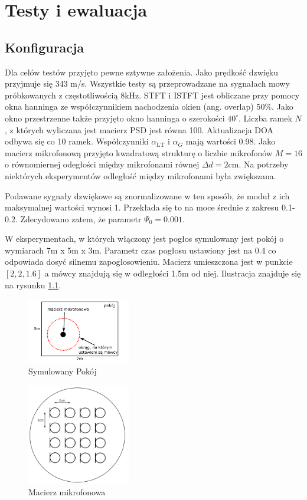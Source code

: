 \chapter{Testy i ewaluacja}
\label{chapter-5}
\section{Konfiguracja}
Dla celów testów przyjęto pewne sztywne założenia. Jako prędkość dzwięku przyjmuje się 343 m/s. Wszystkie testy są przeprowadzane na sygnałach mowy próbkowanych z częstotliwością 8kHz. STFT i ISTFT jest obliczane przy pomocy okna hanninga \cite{hann} ze współczynnikiem nachodzenia okien (ang. overlap) 50$\%$. Jako okno przestrzenne także przyjęto okno hanninga o szerokości $40^{\circ}$. Liczba ramek $N$, z których wyliczana jest macierz PSD jest równa 100. Aktualizacja DOA odbywa się co 10 ramek. Współczynniki $\alpha_{\mathrm{LT}}$ i $\alpha_{G}$ mają wartości 0.98. Jako macierz mikrofonową przyjęto kwadratową strukturę o liczbie mikrofonów $M=16$ o równomiernej odegłości między mikrofonami równej $\Delta d = 2$cm. Na potrzeby niektórych eksperymentów odległość między mikrofonami była zwiększana.

\noindent Podawane sygnały dzwiękowe są znormalizowane w ten sposób, że moduł z ich maksymalnej wartości wynosi 1. Przekłada się to na moce średnie z zakresu 0.1-0.2. Zdecydowano zatem, że parametr $\Psi_{0} = 0.001$. 

\noindent W eksperymentach, w których włączony jest pogłos symulowany jest pokój o wymiarach 7m x 5m x 3m. Parametr czas pogłosu ustawiony jest na 0.4 co odpowiada dosyć silnemu zapogłosowieniu. Macierz umieszczona jest w punkcie $[2,2,1.6]$ a mówcy znajdują się w odległości 1.5m od niej. Ilustracja znajduje się na rysunku \ref{fig:room}.

\begin{figure}[h!]
    \centering
    \includegraphics[width=0.4\textwidth]{Images/room.png}
    \caption{Symulowany Pokój}
    \label{fig:room}
\end{figure}

\begin{figure}[h!]
    \centering
    \includegraphics[width=0.4\textwidth]{Images/microphone.png}
    \caption{Macierz mikrofonowa}
    \label{fig:microphone}
\end{figure}

